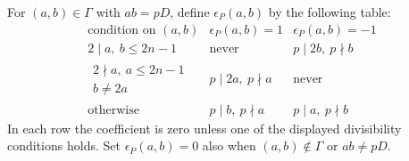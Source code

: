 \documentclass[11pt,a4paper]{amsart}
\theoremstyle{plain}
\numberwithin{equation}{section}
\def \b{\beta}
\begin{document}
For \((a,b)\in\Gamma\) with \(ab=pD\), define
\(\epsilon_P(a,b)\) by the following table:
\begin{equation}\label{eq:B-epsilon-table}
\begin{array}{c|c|c}
\text{condition on }(a,b)&\epsilon_P(a,b)=1&\epsilon_P(a,b)=-1\\ \hline
2\mid a,\ b\le2n-1
&\text{never}&p\mid2b,\ p\nmid b\\[1mm]
\begin{gathered}2\nmid a,\ a\le2n-1\\b\ne2a\end{gathered}
&p\mid2a,\ p\nmid a&\text{never}\\[1mm]
\text{otherwise}
&p\mid b,\ p\nmid a&p\mid a,\ p\nmid b
\end{array}
\end{equation}
In each row the coefficient is zero unless one of the displayed
divisibility conditions holds. Set \(\epsilon_P(a,b)=0\) also
when \((a,b)\notin\Gamma\) or \(ab\ne pD\).
\end{document}
